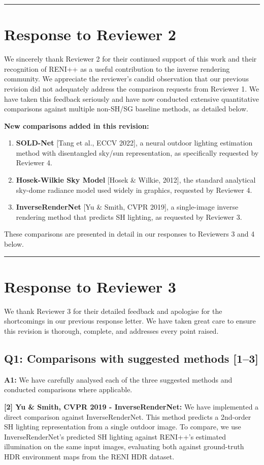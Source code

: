 \documentclass[11pt]{article}
\newcommand{\reviewer}[1]{\section*{\textcolor{reviewercolor}{Response to Reviewer #1}}}
\newcommand{\question}[1]{\subsection*{Q#1}}
\newcommand{\answer}[1]{\textbf{A#1:}}
\begin{document}
\vspace{1em}
\hrule
\vspace{1em}

\reviewer{2}

We sincerely thank Reviewer 2 for their continued support of this work and their recognition of RENI++ as a useful contribution to the inverse rendering community. We appreciate the reviewer's candid observation that our previous revision did not adequately address the comparison requests from Reviewer 1. We have taken this feedback seriously and have now conducted extensive quantitative comparisons against multiple non-SH/SG baseline methods, as detailed below.

\textbf{New comparisons added in this revision:}

\begin{enumerate}
    \item \textbf{SOLD-Net} [Tang et al., ECCV 2022], a neural outdoor lighting estimation method with disentangled sky/sun representation, as specifically requested by Reviewer 4.
    \item \textbf{Hosek-Wilkie Sky Model} [Hosek \& Wilkie, 2012], the standard analytical sky-dome radiance model used widely in graphics, requested by Reviewer 4.
    \item \textbf{InverseRenderNet} [Yu \& Smith, CVPR 2019], a single-image inverse rendering method that predicts SH lighting, as requested by Reviewer 3.
\end{enumerate}

These comparisons are presented in detail in our responses to Reviewers 3 and 4 below.

\vspace{1em}
\hrule
\vspace{1em}

\reviewer{3}

We thank Reviewer 3 for their detailed feedback and apologise for the shortcomings in our previous response letter. We have taken great care to ensure this revision is thorough, complete, and addresses every point raised.

\question{1: Comparisons with suggested methods [1--3]}

\answer{1} We have carefully analysed each of the three suggested methods and conducted comparisons where applicable.

\textbf{[2] Yu \& Smith, CVPR 2019 - InverseRenderNet:}
We have implemented a direct comparison against InverseRenderNet. This method predicts a 2nd-order SH lighting representation from a single outdoor image. To compare, we use InverseRenderNet's predicted SH lighting against RENI++'s estimated illumination on the same input images, evaluating both against ground-truth HDR environment maps from the RENI HDR dataset.
\end{document}
